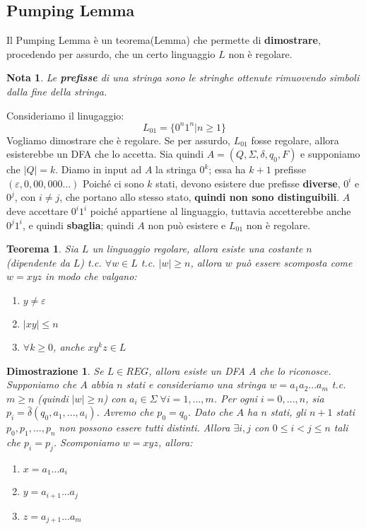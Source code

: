 \documentclass[12pt]{article}
\newtheorem{Teorema}{Teorema}[subsection]
\newtheorem{Dimostrazione}{Dimostrazione}[subsection]
\newtheorem{Nota}{Nota}[subsection]
\begin{document}
\subsection{Pumping Lemma}
Il Pumping Lemma è un teorema(Lemma) che permette di \textbf{dimostrare}, procedendo per assurdo, che un certo linguaggio $L$ non è regolare.
\begin{Nota}
    Le \textbf{prefisse} di una stringa sono le stringhe ottenute rimuovendo simboli dalla fine della stringa.
\end{Nota}
Consideriamo il linugaggio:
$$L_{01} = \{0^n 1^n |n \geq 1 \}$$
Vogliamo dimostrare che è regolare. Se per assurdo, $L_{01}$ fosse regolare, allora esisterebbe un DFA che lo accetta. Sia quindi $A = (Q, \Sigma, \delta, q_0, F)$ e supponiamo che $|Q| = k$. Diamo in input ad $A$ la stringa $0^{k}$; essa ha $k + 1$ prefisse $(\varepsilon, 0, 00, 000...)$ Poiché ci sono $k$ stati, devono esistere due prefisse \textbf{diverse}, $0^i$ e $0^j$, con $i \neq j$, che portano allo stesso stato, \textbf{quindi non sono distinguibili}. $A$ deve accettare $0^i1^i$ poiché appartiene al linguaggio, tuttavia accetterebbe anche $0^j1^i$, e quindi \textbf{sbaglia}; quindi $A$ non può esistere e $L_{01}$ non è regolare.
\begin{Teorema}
    Sia $L$ un linguaggio regolare, allora esiste una costante $n$ (dipendente da $L$) t.c. $\forall w \in L$ t.c. $|w| \geq n$, allora $w$ può essere scomposta come $w = xyz$ in modo che valgano:
    \begin{enumerate}
        \item $y \neq \varepsilon$
        \item $|xy| \leq n$
        \item $\forall k \geq 0$, anche $xy^kz \in L$
    \end{enumerate}
\end{Teorema}
\begin{Dimostrazione}
    Se $L \in REG$, allora esiste un DFA $A$ che lo riconosce. Supponiamo che $A$ abbia $n$ stati e consideriamo una stringa $w = a_1a_2...a_m$ t.c. $m \geq n$ (quindi $|w| \geq n$) con $a_i \in \Sigma \; \forall i = 1,...,m$. Per ogni $i = 0,...,n$, sia $p_i = \hat{\delta}(q_0, a_1,...,a_i)$. Avremo che $p_0 = q_0$. Dato che $A$ ha $n$ stati, gli $n+1$ stati $p_0, p_1,...,p_n$ non possono essere tutti distinti. Allora $\exists i,j$ con $0\leq i < j \leq n$ tali che $p_i = p_j$. Scomponiamo $w = xyz$, allora:
    \begin{enumerate}
        \item $x = a_1...a_i$
        \item $y = a_{i+1}...a_j$
        \item $z = a_{j+1}...a_m$
    \end{enumerate}
\end{Dimostrazione}
\end{document}
